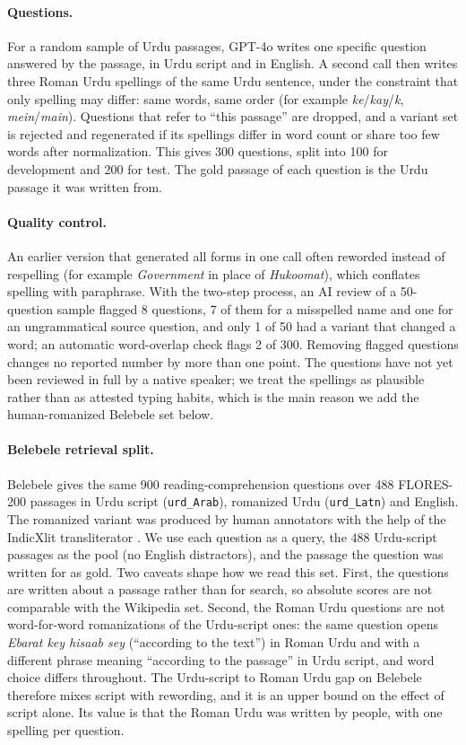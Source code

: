 \documentclass[11pt]{article}
\begin{document}
\paragraph{Questions.} For a random sample of Urdu passages, GPT-4o writes one specific question answered by the passage, in Urdu script and in English. A second call then writes three Roman Urdu spellings of the same Urdu sentence, under the constraint that only spelling may differ: same words, same order (for example \textit{ke}/\textit{kay}/\textit{k}, \textit{mein}/\textit{main}). Questions that refer to ``this passage'' are dropped, and a variant set is rejected and regenerated if its spellings differ in word count or share too few words after normalization. This gives 300 questions, split into 100 for development and 200 for test. The gold passage of each question is the Urdu passage it was written from.

\paragraph{Quality control.} An earlier version that generated all forms in one call often reworded instead of respelling (for example \textit{Government} in place of \textit{Hukoomat}), which conflates spelling with paraphrase. With the two-step process, an AI review of a 50-question sample flagged 8 questions, 7 of them for a misspelled name and one for an ungrammatical source question, and only 1 of 50 had a variant that changed a word; an automatic word-overlap check flags 2 of 300. Removing flagged questions changes no reported number by more than one point. The questions have not yet been reviewed in full by a native speaker; we treat the spellings as plausible rather than as attested typing habits, which is the main reason we add the human-romanized Belebele set below.

\paragraph{Belebele retrieval split.} Belebele \citep{bandarkar2024belebele} gives the same 900 reading-comprehension questions over 488 FLORES-200 passages in Urdu script (\texttt{urd\_Arab}), romanized Urdu (\texttt{urd\_Latn}) and English. The romanized variant was produced by human annotators with the help of the IndicXlit transliterator \citep{madhani2023aksharantar}. We use each question as a query, the 488 Urdu-script passages as the pool (no English distractors), and the passage the question was written for as gold. Two caveats shape how we read this set. First, the questions are written about a passage rather than for search, so absolute scores are not comparable with the Wikipedia set. Second, the Roman Urdu questions are not word-for-word romanizations of the Urdu-script ones: the same question opens \textit{Ebarat key hisaab sey} (``according to the text'') in Roman Urdu and with a different phrase meaning ``according to the passage'' in Urdu script, and word choice differs throughout. The Urdu-script to Roman Urdu gap on Belebele therefore mixes script with rewording, and it is an upper bound on the effect of script alone. Its value is that the Roman Urdu was written by people, with one spelling per question.
\end{document}
